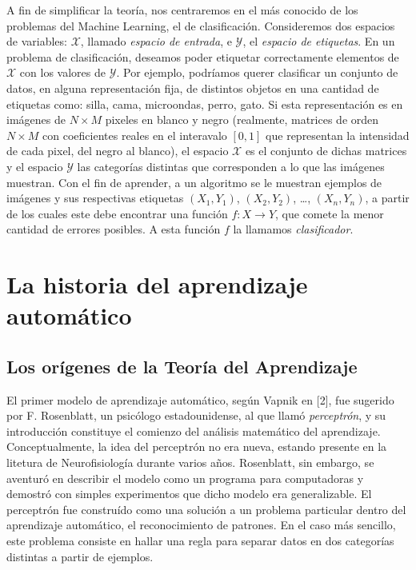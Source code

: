 \documentclass{report}
\begin{document}
A fin de simplificar la teoría, nos centraremos  en el más conocido de los problemas del Machine Learning, el de clasificación. Consideremos dos espacios
de variables: \(\mathcal{X}\), llamado \textit{espacio de entrada}, e \(\mathcal{Y}\), el  \textit{espacio de etiquetas}. En un problema de clasificación, deseamos poder etiquetar 
correctamente elementos de \(\mathcal{X}\) con los valores de \(\mathcal{Y}\). Por ejemplo, podríamos querer clasificar un conjunto de datos, en alguna representación fija, de distintos 
objetos en una cantidad de etiquetas como: silla, cama, microondas, perro, gato. Si esta representación es en imágenes de \(N\times M\) pixeles en blanco y negro (realmente, 
matrices de orden \(N\times M\) con coeficientes reales en el interavalo \([0,1]\) que representan la intensidad de cada pixel, del negro al blanco), el espacio \(\mathcal{X}\) es 
el conjunto de dichas matrices y el espacio \(\mathcal{Y}\) las categorías distintas que corresponden a lo que las imágenes muestran. Con el fin de aprender, a un algoritmo se le 
muestran ejemplos de imágenes y sus respectivas etiquetas \((X_1,Y_1)\), \((X_2,Y_2)\), \dots, \((X_n,Y_n)\), a partir de los cuales este debe encontrar una función
\(f: X\rightarrow Y\), que comete la menor cantidad de errores posibles. A esta función \(f\) la llamamos \textit{clasificador}.\newline

\section{La historia del aprendizaje automático}

\subsection{Los orígenes de la Teoría del Aprendizaje}

El primer modelo de aprendizaje automático, según Vapnik en [2], fue sugerido por F. Rosenblatt, un psicólogo estadounidense, al que llamó \textit{perceptrón}, y su introducción
constituye el comienzo del análisis matemático del aprendizaje. Conceptualmente, la idea del perceptrón no era nueva, estando presente en la litetura de Neurofisiología durante
varios años. Rosenblatt, sin embargo, se aventuró en describir el modelo como un programa para computadoras y demostró con simples experimentos que dicho modelo era generalizable.
El perceptrón fue construído como una solución a un problema particular dentro del aprendizaje automático, el reconocimiento de patrones. En el caso más sencillo, este problema
consiste en hallar una regla para separar datos en dos categorías distintas a partir de ejemplos.\newline
\end{document}
